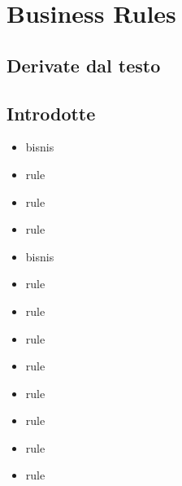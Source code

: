 \section{Business Rules}
\subsection{Derivate dal testo}

\subsection{Introdotte}
\begin{itemize}
    \item bisnis
    \item rule
    \item rule
    \item rule
    \item bisnis
    \item   rule
    \item   rule
    \item   rule
    \item   rule
    \item       rule
    \item    rule
    \item   rule
    \item   rule
\end{itemize}